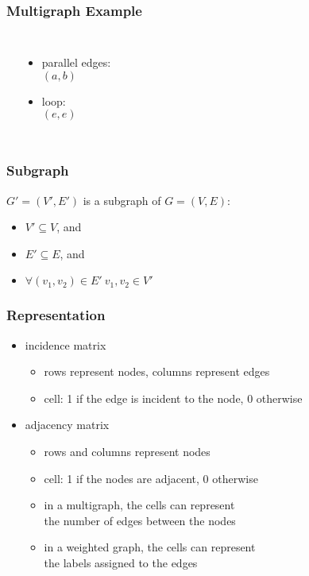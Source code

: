 \documentclass[dvipsnames]{beamer}
\begin{document}
\begin{frame}
  \frametitle{Multigraph Example}

  \begin{example}
    \begin{columns}
      \begin{center}
      \end{center}

      \begin{itemize}
        \item parallel edges:\\
          $(a,b)$
        \item loop:\\
          $(e,e)$
      \end{itemize}
    \end{columns}
  \end{example}
\end{frame}

\begin{frame}
  \frametitle{Subgraph}

  \begin{definition}
    $G'=(V',E')$ is a \alert{subgraph} of $G=(V,E)$:

    \begin{itemize}
      \item $V' \subseteq V$, and
      \item $E' \subseteq E$, and
      \item $\forall (v_1,v_2) \in E'~v_1,v_2 \in V'$
    \end{itemize}
  \end{definition}
\end{frame}

\begin{frame}
  \frametitle{Representation}

  \begin{itemize}
    \item incidence matrix
    \begin{itemize}
      \item rows represent nodes, columns represent edges
      \item cell: 1 if the edge is incident to the node, 0 otherwise
    \end{itemize}

    \medskip
    \item adjacency matrix
    \begin{itemize}
      \item rows and columns represent nodes
      \item cell: 1 if the nodes are adjacent, 0 otherwise
      \item in a multigraph, the cells can represent\\
        the number of edges between the nodes
      \item in a weighted graph, the cells can represent\\
        the labels assigned to the edges
    \end{itemize}
  \end{itemize}
\end{frame}
\end{document}
